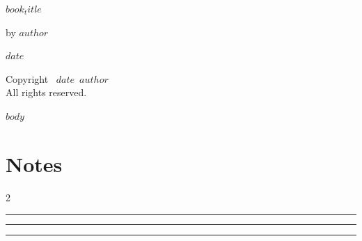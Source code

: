 \documentclass[10pt]{memoir}
\def\booktitle{$book_title$}
\def\bookauthor{$author$}
\def\bookdate{$date$}
\begin{document}
\thispagestyle{empty}
\begin{center}
\vspace*{1.5in}
{\Huge\bfseries\booktitle\par}
\vspace{1in}
{\large by \bookauthor\par}
\vfill
{\large\bookdate}
\end{center}

\clearpage
\thispagestyle{empty}
\vspace*{\fill}
\begin{center}
Copyright \textcopyright\ \bookdate\ \bookauthor\\
All rights reserved.
\end{center}
\vspace*{\fill}

\clearpage
\tableofcontents

\mainmatter

$body$

\clearpage
\section*{Notes}
\vspace{1in}
\begin{multicols}{2}
\noindent\rule{\linewidth}{0.5pt}
\vfill\columnbreak
\noindent\rule{\linewidth}{0.5pt}
\vfill\columnbreak
\noindent\rule{\linewidth}{0.5pt}
\end{multicols}
\end{document}

